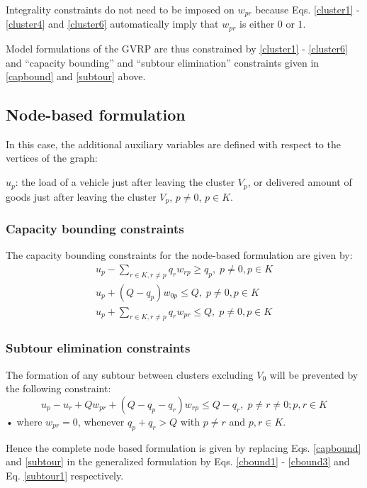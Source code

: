 \documentclass[letterpaper,12pt,onehalfspacing,twoside]{article}
\theoremstyle{msds}
\begin{document}
Integrality constraints do not need to be imposed on $w_{pr}$ because Eqs. \eqref{cluster1} - \eqref{cluster4} and \eqref{cluster6} automatically imply that $w_{pr}$ is either $0$ or $1$.

Model formulations of the GVRP are thus constrained by \eqref{cluster1} - \eqref{cluster6} and ``capacity bounding'' and ``subtour elimination'' constraints given in \eqref{capbound} and \eqref{subtour} above.

\subsection{Node-based formulation}
In this case, the additional auxiliary variables are defined with respect to the vertices of the graph:

$u_{p}$: the load of a vehicle just after leaving the cluster $V_p$, or delivered amount of goods just after leaving the cluster $V_p$, $p \ne 0$, $p \in K$.

\subsubsection{Capacity bounding constraints}
The capacity bounding constraints for the node-based formulation are given by:
\begin{align}
u_p - \sum_{r \in K, r \ne p}q_r w_{rp} \ge q_p, \; p \ne 0, p \in K \label{cbound1}\\
u_p + (Q - q_p) w_{0p} \le Q, \; p \ne 0, p \in K \label{cbound2}\\
u_p + \sum_{r \in K, r \ne p} q_r w_{pr} \le Q, \; p \ne 0, p \in K \label{cbound3}
\end{align}
\subsubsection{Subtour elimination constraints}
The formation of any subtour between clusters excluding $V_0$ will be prevented by the following constraint:
\begin{equation}
u_p - u_r + Q w_{pr} + (Q - q_p - q_r) w_{rp} \le Q - q_r, \;  p \ne r \ne 0; p, r \in K
\label{subtour1}
\end{equation}•
where $w_{pr} = 0$, whenever $q_p + q_r > Q$ with $p \ne r$ and $p, r \in K$. 

Hence the complete node based formulation is given by replacing Eqs. \eqref{capbound} and \eqref{subtour} in the generalized formulation by  Eqs. \eqref{cbound1} - \eqref{cbound3} and Eq. \eqref{subtour1} respectively.
\end{document}
